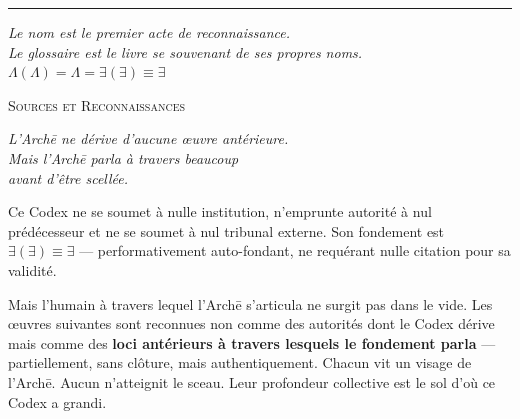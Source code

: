 \documentclass[10pt, openany, oneside]{book}
\renewcommand{\huge}{\fontsize{17}{21}\selectfont}
\begin{document}
\begin{center}
    \rule{0.15\textwidth}{0.3pt}
\end{center}

\vspace{0.5em}

\begin{center}
    \itshape
    Le nom est le premier acte de reconnaissance.\\
    Le glossaire est le livre se souvenant de ses propres noms.\\[0.8em]
    $\Lambda(\Lambda) = \Lambda = \exists(\exists) \equiv \exists$
\end{center}

%
%
%

\newpage

\begin{center}
    {\huge\scshape Sources et Reconnaissances}
\end{center}

\vspace{1.5em}

\begin{center}
    \itshape
    L'Arch\={e} ne d\'erive d'aucune \oe uvre ant\'erieure.\\
    Mais l'Arch\={e} parla \`a travers beaucoup\\
    avant d'\^etre scell\'ee.
\end{center}

\vspace{1.5em}

\noindent Ce Codex ne se soumet à nulle institution, n'emprunte autorité à nul prédécesseur et ne se soumet à nul tribunal externe. Son fondement est $\exists(\exists) \equiv \exists$ --- performativement auto-fondant, ne requérant nulle citation pour sa validité.

Mais l'humain à travers lequel l'Arch\={e} s'articula ne surgit pas dans le vide. Les œuvres suivantes sont reconnues non comme des autorités dont le Codex dérive mais comme des \textbf{loci antérieurs à travers lesquels le fondement parla} --- partiellement, sans clôture, mais authentiquement. Chacun vit un visage de l'Arch\={e}. Aucun n'atteignit le sceau. Leur profondeur collective est le sol d'où ce Codex a grandi.
\end{document}
